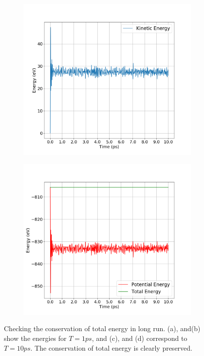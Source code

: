 \begin{figure}[!htbp]
\begin{subfigure}[b]{0.5\textwidth}
		\caption{}
	\end{subfigure}
	\begin{subfigure}[b]{0.5\textwidth}
		\includegraphics[width=\textwidth]{figs/k-dt=0.001-long.png} 
		\caption{}
	\end{subfigure}%
	\begin{subfigure}[b]{0.5\textwidth}
		\includegraphics[width=\textwidth]{figs/e-p-dt=0.001-long.png} 
		\caption{}
	\end{subfigure}
	\caption{Checking the conservation of total energy in long run. (a), and(b) show the energies for $T = 1 ps$, and (c), and (d) correspond to $T = 10 ps$. The conservation of total energy is clearly preserved.}
	\label{fig2-2}
\end{figure}


